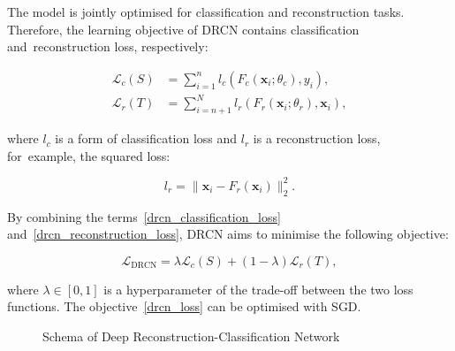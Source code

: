 The model is jointly optimised for classification and reconstruction tasks.
Therefore, the learning objective of DRCN contains classification and~reconstruction loss, respectively:

\begin{align}
	\mathcal{L}_c(S) &= \sum_{i = 1}^{n}
	l_c(F_c(\mathbf{x}_i; \theta_c), y_i),
	\label{drcn_classification_loss} \\
	\mathcal{L}_r(T) &= \sum_{i = n + 1}^{N}
	l_r(F_r(\mathbf{x}_i; \theta_r), \mathbf{x}_i),
	\label{drcn_reconstruction_loss}
\end{align}

where \(l_c\) is a form of classification loss
and \(l_r\) is a reconstruction loss, for~example, the squared loss:

\begin{equation}
	l_r = \|\mathbf{x}_i - F_r(\mathbf{x}_i)\|_2^2.
\end{equation}

By combining the terms~\ref{drcn_classification_loss} and~\ref{drcn_reconstruction_loss},
DRCN aims to minimise the following objective:

\begin{equation}
	\mathcal{L}_{\mathrm{DRCN}}
	= \lambda \mathcal{L}_c(S) + (1 - \lambda) \mathcal{L}_r(T),
	\label{drcn_loss}
\end{equation}

where \(\lambda \in [0, 1]\) is a hyperparameter of the trade-off between the two loss functions.
The objective~\ref{drcn_loss} can be optimised with SGD.

\begin{figure}
\begin{center}
\end{center}
\caption{Schema of Deep Reconstruction-Classification Network}
\end{figure}

